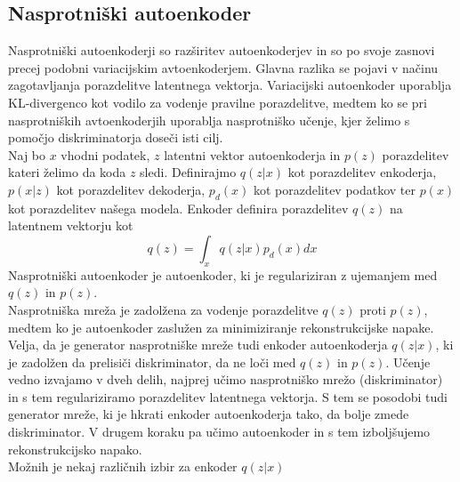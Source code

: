 \documentclass[12pt,a4paper,twoside]{article}
\theoremstyle{definition} %
\theoremstyle{plain} %
\numberwithin{equation}{section}  %
\begin{document}
\subsection{Nasprotniški autoenkoder}
Nasprotniški autoenkoderji \cite{adverserialautoencoders} so razširitev autoenkoderjev in so po svoje zasnovi precej podobni variacijskim avtoenkoderjem.  
Glavna razlika se pojavi v načinu zagotavljanja porazdelitve latentnega vektorja. Variacijski autoenkoder uporablja KL-divergenco kot vodilo za vodenje pravilne porazdelitve, medtem ko se
pri nasprotniških avtoenkoderjih uporablja nasprotniško učenje, kjer želimo s pomočjo diskriminatorja doseči isti cilj. 
\\
Naj bo $x$ vhodni podatek, $z$ latentni vektor autoenkoderja in $p(z)$ porazdelitev kateri želimo da koda $z$ sledi. Definirajmo $q(z|x)$ kot porazdelitev enkoderja, $p(x|z)$ kot porazdelitev dekoderja, $p_d(x)$ kot porazdelitev podatkov ter 
$p(x)$ kot porazdelitev našega modela. Enkoder definira porazdelitev $q(z)$ na latentnem vektorju kot  $$ q(z) = \int_x q(z|x)p_d(x)dx $$
Nasprotniški autoenkoder je autoenkoder, ki je regulariziran z ujemanjem med $q(z)$ in $p(z)$. \\
Nasprotniška mreža je zadolžena za vodenje porazdelitve $q(z)$ proti $p(z)$, medtem ko je autoenkoder zaslužen za minimiziranje rekonstrukcijske napake. 
Velja, da je generator nasprotniške mreže tudi enkoder autoenkoderja $q(z|x)$, ki je zadolžen da prelisiči diskriminator, da ne loči med $q(z)$ in $p(z)$.
Učenje vedno izvajamo v dveh delih, najprej učimo nasprotniško mrežo (diskriminator) in s tem regulariziramo porazdelitev latentnega vektorja. S tem se posodobi tudi generator mreže, ki je hkrati enkoder autoenkoderja tako, da bolje zmede diskriminator.  V 
drugem koraku pa učimo autoenkoder in s tem izboljšujemo rekonstrukcijsko napako. 
\\
Možnih je nekaj različnih izbir za enkoder $q(z|x)$
\end{document}
